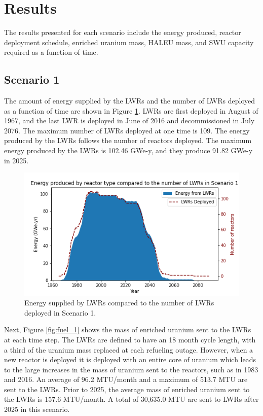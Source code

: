 \section{Results}
The results presented for each scenario include the energy produced, reactor 
deployment schedule, enriched
uranium mass, \gls{HALEU} mass, and \gls{SWU} capacity required as a function of time. 

\subsection{Scenario 1}
The amount of energy supplied by the \glspl{LWR} and the number of \glspl{LWR}
deployed as a function of time are shown in Figure \ref{fig:energy_rx_1}. 
\glspl{LWR} are first deployed in August of 1967, and the last 
\gls{LWR} is deployed in June of 2016 and decommissioned in July 2076. The 
maximum number of 
\glspl{LWR} deployed at one time is 109. The energy produced by the 
\glspl{LWR} follows the number of reactors deployed. The maximum energy 
produced by the \glspl{LWR} is 102.46 GWe-y, and they produce 91.82 GWe-y 
in 2025.

\begin{figure}
    \centering 
    \includegraphics[width=\textwidth]{../figures/energy_scenario1.png}
    \caption{Energy supplied by \glspl{LWR} compared to the number of 
    \glspl{LWR} deployed in Scenario 1.}
    \label{fig:energy_rx_1}
\end{figure}

Next, Figure \ref{fig:fuel_1} shows the mass of enriched uranium sent to 
the \glspl{LWR} at each time step. The \glspl{LWR} are 
defined to have an 18 month cycle length, with a third of the uranium 
mass replaced at each refueling outage. However, when a new reactor 
is deployed it is deployed with an entire core of uranium which leads 
to the large increases in the mass of uranium sent to the reactors, such 
as in 1983 and 2016. An average of 96.2 MTU/month and a maximum of 513.7 MTU 
are sent to the \glspl{LWR}. Prior to 2025, the average mass
of enriched uranium sent to the \glspl{LWR} is 157.6 MTU/month. A total 
of 30,635.0 MTU are sent to \glspl{LWR} after 2025 in this scenario. 

